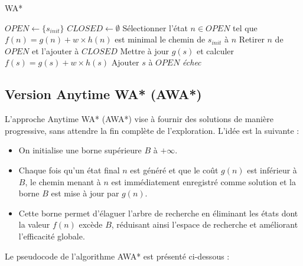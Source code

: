 \begin{algorithm}[H]
    \caption{WA*}
    \begin{algorithmic}[1]
    \State $OPEN \gets \{s_{init}\}$
    \State $CLOSED \gets \emptyset$
        \State Sélectionner l'état $n \in OPEN$ tel que $f(n) = g(n) + w \times h(n)$ est minimal
            \State \Return le chemin de $s_{init}$ à $n$
        \EndIf
        \State Retirer $n$ de $OPEN$ et l'ajouter à $CLOSED$
                \State Mettre à jour $g(s)$ et calculer $f(s) = g(s) + w \times h(s)$
                \State Ajouter $s$ à $OPEN$
            \EndIf
        \EndFor
    \EndWhile
    \State \Return \textit{échec}
    \end{algorithmic}
\end{algorithm}

\subsection{Version Anytime WA* (AWA*)}

L'approche Anytime WA* (AWA*) vise à fournir des solutions de manière progressive, sans attendre la fin complète de l'exploration. L'idée est la suivante :
\begin{itemize}
    \item On initialise une borne supérieure $B$ à $+\infty$.
    \item Chaque fois qu'un état final $n$ est généré et que le coût $g(n)$ est inférieur à $B$, le chemin menant à $n$ est immédiatement enregistré comme solution et la borne $B$ est mise à jour par $g(n)$.
    \item Cette borne permet d'élaguer l'arbre de recherche en éliminant les états dont la valeur $f(n)$ excède $B$, réduisant ainsi l'espace de recherche et améliorant l'efficacité globale.
\end{itemize}

Le pseudocode de l'algorithme AWA* est présenté ci-dessous :

